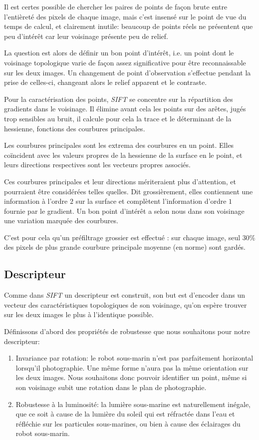 \documentclass[
	a4paper, %
	10pt, %
	unnumberedsections, %
	twoside, %
]{LTJournalArticle}
\begin{document}
Il est certes possible de chercher les paires de points de façon brute entre
l'entièreté des pixels de chaque image, mais c'est insensé sur le
point de vue du temps de calcul, et clairement inutile: beaucoup de
points réels ne présentent que peu d'intérêt car leur voisinage présente
peu de relief.

La question est alors de définir un bon point
d'intérêt, i.e. un point dont le voisinage topologique varie de façon
assez significative pour être reconnaissable sur les deux images.
Un changement de point d'observation s'effectue pendant
la prise de celles-ci, changeant alors le relief apparent et le contraste.

Pour la caractérisation des points, \textit{SIFT} se concentre sur la répartition des gradients
dans le voisinage. Il élimine avant cela les points sur des arêtes, jugés trop
sensibles au bruit, il calcule pour cela la trace et le déterminant
de la hessienne, fonctions des courbures principales.

Les courbures principales sont les extrema des courbures en un point.
Elles coïncident avec les valeurs propres de la hessienne de la surface en le point,
et leurs directions respectives sont les vecteurs propres associés.

Ces courbures principales et leur directions mériteraient plus d'attention,
et pourraient être considérées telles quelles. Dit grossièrement,
elles contiennent une information à l'ordre $2$ sur la surface et complètent
l'information d'ordre $1$ fournie par le gradient. Un bon
point d'intérêt a selon nous dans son voisinage une variation marquée des courbures.


C'est pour cela qu'un préfiltrage grossier est effectué : sur chaque image,
seul $30 \%$ des pixels de plus grande courbure principale moyenne (en norme)
sont gardés.

\subsection{Descripteur}\label{subsection:descripteur}
Comme dans \textit{SIFT} un descripteur est construit,
son but est d'encoder dans un vecteur des caractéristiques topologiques de son voisinage, qu'on espère trouver
sur les deux images le plus à l'identique possible.

Définissons d'abord des propriétés de robustesse
que nous souhaitons pour notre descripteur:

\begin{enumerate}
	\item Invariance par rotation: le robot sous-marin n'est pas parfaitement
	      horizontal lorsqu'il photographie. Une même forme n'aura pas la même
	      orientation sur les deux images. Nous souhaitons donc pouvoir identifier un
	      point, même si son voisinage subit une rotation dans le plan de photographie.
	\item Robustesse à la luminosité: la lumière sous-marine est naturellement inégale,
	      que ce soit à cause de la lumière du soleil qui est réfractée dans l'eau
	      et réfléchie sur les particules sous-marines, ou bien à
	      cause des éclairages du robot sous-marin.
\end{enumerate}
\end{document}
